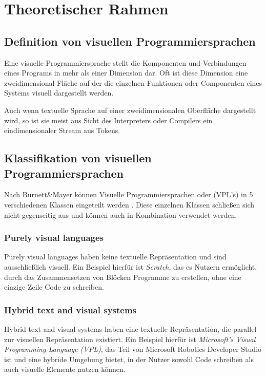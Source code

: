\documentclass[ngerman]{article}
\begin{document}
\section{Theoretischer Rahmen}

\subsection{Definition von visuellen Programmiersprachen}
Eine visuelle Programmiersprache stellt die Komponenten und Verbindungen eines Programs in mehr als einer Dimension dar. Oft ist diese Dimension eine zweidimensional Fläche auf der die einzelnen Funktionen oder Componenten eines Systems visuell dargestellt werden. \cite{Myers}

Auch wenn textuelle Sprache auf einer zweidimensionalen Oberfläche dargestellt wird, so ist sie meist aus Sicht des Interpreters oder Compilers ein eindimensionaler Stream aus Tokens.

\subsection{Klassifikation von visuellen Programmiersprachen}

Nach Burnett\&Mayer können Visuelle Programmiersprachen oder (VPL's) in 5 verschiedenen Klassen eingeteilt werden \cite{BURNETT1994287}. Diese einzelnen Klassen schließen sich nicht gegenseitig aus und können auch in Kombination verwendet werden.

\subsubsection{Purely visual languages}
Purely visual languages haben keine textuelle Repräsentation und sind ausschließlich visuell. Ein Beispiel hierfür ist \textit{Scratch}, das es Nutzern ermöglicht, durch das Zusammensetzen von Blöcken Programme zu erstellen, ohne eine einzige Zeile Code zu schreiben.

\subsubsection{Hybrid text and visual systems}
Hybrid text and visual systems haben eine textuelle Repräsentation, die parallel zur visuellen Repräsentation existiert. Ein Beispiel hierfür ist \textit{Microsoft's Visual Programming Language (VPL)}, das Teil von Microsoft Robotics Developer Studio ist und eine hybride Umgebung bietet, in der Nutzer sowohl Code schreiben als auch visuelle Elemente nutzen können.
\end{document}

